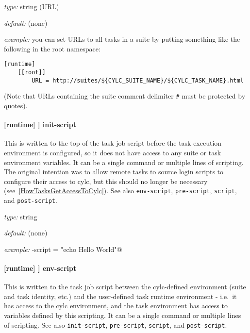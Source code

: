 \begin{myitemize}
\item {\em type:} string (URL)
\item {\em default:} (none)
\item {\em example:} you can set URLs to all tasks in a suite by putting
    something like the following in the root namespace:
    \begin{lstlisting}
[runtime]
    [[root]]
        URL = http://suites/${CYLC_SUITE_NAME}/${CYLC_TASK_NAME}.html
    \end{lstlisting}
\end{myitemize}

(Note that URLs containing the suite comment delimiter
\lstinline=#= must be protected by quotes).

\paragraph[init-script]{[runtime] \textrightarrow [[\_\_NAME\_\_]] \textrightarrow init-script}

This is written to the top of the task job script before the task execution
environment is configured, so it does not have access to any suite or task
environment variables. It can be a single command or multiple lines of
scripting. The original intention was to allow remote tasks to
source login scripts to configure their access to cylc, but this should no
longer be necessary (see~\ref{HowTasksGetAccessToCylc}). See also
\lstinline=env-script=, \lstinline=pre-script=, \lstinline=script=, and
\lstinline=post-script=.

\begin{myitemize}
\item {\em type:} string
\item {\em default:} (none)
\item {\em example:} \lstinline@init-script = "echo Hello World"@
\end{myitemize}

\paragraph[env-script]{[runtime] \textrightarrow [[\_\_NAME\_\_]] \textrightarrow env-script}

This is written to the task job script between the cylc-defined environment
(suite and task identity, etc.) and the user-defined task runtime environment -
i.e.\ it has access to the cylc environment, and the task environment has
access to variables defined by this scripting. It can be a single command or
multiple lines of scripting.  See also \lstinline=init-script=,
\lstinline=pre-script=, \lstinline=script=, and \lstinline=post-script=.

